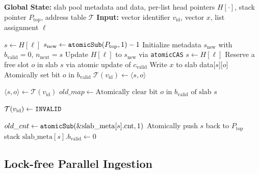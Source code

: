 \documentclass[sigconf,nonacm]{acmart}
\theoremstyle{plain}
\theoremstyle{definition}
\theoremstyle{remark}
\begin{document}
\begin{algorithm}[t]
\caption{Core operations of SDMA}
\label{alg:sdma_core}
\begin{algorithmic}[1]
\State \textbf{Global State:} slab pool metadata and data, per-list head pointers $H[\cdot]$, stack pointer $P_{\text{top}}$, address table $\mathcal{T}$
\State \textbf{Input:} vector identifier $v_{\text{id}}$, vector $x$, list assignment $\ell$

    \State $s \gets H[\ell]$
        \State $s_{\text{new}} \gets \textnormal{\texttt{atomicSub}}(P_{\text{top}}, 1) - 1$
        \State Initialize metadata $s_{\text{new}}$ with $b_{\text{valid}}=0$, $n_{\text{next}}=s$
        \State Update $H[\ell]$ to $s_{\text{new}}$ via \textnormal{\texttt{atomicCAS}}
        \State $s \gets H[\ell]$
    \EndWhile
    \State Reserve a free slot $o$ in slab $s$ via atomic update of $c_{\text{valid}}$
    \State Write $x$ to slab data[$s$][$o$]
    \State Atomically set bit $o$ in $b_{\text{valid}}$
    \State $\mathcal{T}(v_{\text{id}}) \gets \langle s, o \rangle$
\EndProcedure

    \State $\langle s, o \rangle \gets \mathcal{T}(v_{\text{id}})$
        \State $old\_map \gets \text{Atomically clear bit } o \text{ in } b_{\text{valid}} \text{ of slab } s$
        
            \State $\mathcal{T}(v_{\text{id}}) \gets \textnormal{\texttt{INVALID}}$
            
            \State $old\_cnt \gets \textnormal{\texttt{atomicSub}}(\&\text{slab\_meta}[s].\text{cnt}, 1)$
                \State Atomically push $s$ back to $P_{\text{top}}$ stack
                \State $\text{slab\_meta}[s].b_{\text{valid}} \gets 0$
            \EndIf
        \EndIf
    \EndIf
\EndProcedure
\end{algorithmic}
\end{algorithm}

\subsection{Lock-free Parallel Ingestion}
\label{sec:lock_free_ingestion}
\end{document}
